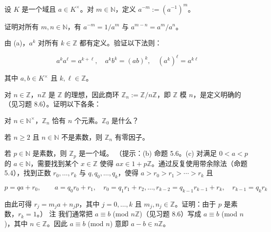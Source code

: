 \begin{exercises}
\item

设 $ K $ 是一个域且 $ a \in K^\times $。对 $ m \in \mathbb{N} $，定义 $ a^{-m} := (a^{-1})^m $。

\begin{items}
\item

证明对所有 $ m, n \in \mathbb{N} $，有 $ a^{-m} = 1/a^m $ 与 $ a^{m-n} = a^m/a^n $。

\item

由 (a)，$ a^k $ 对所有 $ k \in \mathbb{Z} $ 都有定义。验证以下法则：

\[
a^{k}a^{\ell}=a^{k+\ell},\quad a^{k}b^{k}=(a b)^{k},\quad(a^{k})^{\ell}=a^{k\ell}
\]

其中 $ a, b \in K^\times $ 且 $ k, \ell \in \mathbb{Z} $。

\end{items}

\item

对 $ n \in \mathbb{Z} $，$ n\mathbb{Z} $ 是 $ \mathbb{Z} $ 的理想，因此商环 $ \mathbb{Z}_n := \mathbb{Z}/n\mathbb{Z} $，即 $ \mathbb{Z} $ 模 $ n $，是定义明确的（见习题 8.6）。证明以下各条：

\begin{items}
\item

对 $ n \in \mathbb{N}^\times $，$ \mathbb{Z}_n $ 恰有 $ n $ 个元素。$ \mathbb{Z}_0 $ 是什么？

\item

若 $ n \geq 2 $ 且 $ n \in \mathbb{N} $ 不是素数，则 $ \mathbb{Z}_n $ 有零因子。

\item

若 $ p \in \mathbb{N} $ 是素数，则 $ \mathbb{Z}_p $ 是一个域。
（提示：(b) 命题 5.6。(c) 对满足 $ 0 < a < p $ 的 $ a \in \mathbb{N} $，需要找到某个 $ x \in \mathbb{Z} $ 使得 $ ax \in 1 + p\mathbb{Z} $。通过反复使用带余除法（命题 5.4），找到正数 $ r_0, \ldots, r_k $ 与 $ q, q_0, \ldots, q_k $，使得 $ a > r_0 > r_1 > \cdots > r_k $ 且

\[
p=q a+r_{0},\qquad a=q_{0}r_{0}+r_{1},\quad r_{0}=q_{1}r_{1}+r_{2},\ldots,r_{k-2}=q_{k-1}r_{k-1}+r_{k},\quad r_{k-1}=q_{k}r_{k}
\]

由此可得 $ r_j = m_ja + n_jp $，其中 $ j = 0, \ldots, k $ 且 $ m_j, n_j \in \mathbb{Z} $。证明：由于 $ p $ 是素数，$ r_k = 1 $。）
注 我们通常把 $ a \equiv b $ (mod $ n\mathbb{Z} $)（见习题 8.6）写成 $ a \equiv b $ (mod $ n $)，其中 $ n \in \mathbb{Z} $。因此 $ a \equiv b $ (mod $ n $) 意即 $ a - b \in n\mathbb{Z} $。


\end{items}
\end{exercises}
